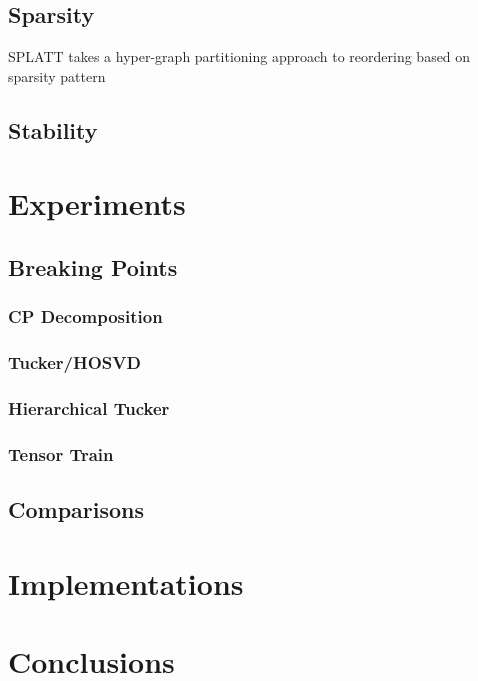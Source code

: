 \documentclass[leqno,onefignum,onetabnum]{siamltex1213}
\begin{document}
\subsection{Sparsity}
SPLATT takes a hyper-graph partitioning approach to reordering based on sparsity pattern~\cite{SPLATT}

\subsection{Stability}
\section{Experiments}
\subsection{Breaking Points}

\subsubsection{CP Decomposition}

\subsubsection{Tucker/HOSVD}

\subsubsection{Hierarchical Tucker}

\subsubsection{Tensor Train}

\subsection{Comparisons}
\section{Implementations}

\section{Conclusions} \label{sec:conclusions}
\end{document}
